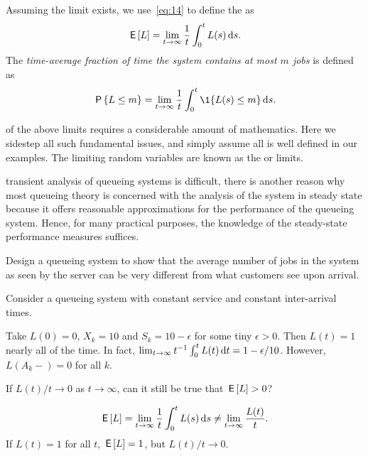 Assuming the limit exists, we use~\cref{eq:14} to define the  as
\begin{equation} \label{eq:46}
 \,\mathsf{E}\left[L\right] = \lim_{t\to\infty} \frac 1 t\int_0^t L(s) \,\textrm{d}s.
\end{equation}
 The \emph{time-average fraction of time the system contains at most $m$ jobs} is defined as
\begin{equation*}
 \P{\L\leq m} =\lim_{t\to\infty} \frac 1 t\int_0^t \1{\L(s)\leq m} \d s.
\end{equation*}

 of the above limits requires a considerable amount of mathematics.
Here we sidestep all such fundamental issues, and simply assume all is well defined in our examples.
The limiting random variables are known as the  or  limits.

 transient analysis of queueing systems is difficult, there is another reason why most queueing theory is concerned with the analysis of the system in steady state because it offers  reasonable approximations for the performance of the  queueing system. Hence, for many practical purposes, the knowledge of the steady-state performance measures suffices.

\begin{exercise}\label{ex:l-165}
Design a queueing system to show that the average number of jobs in the system as seen by the server can be very different from what customers see upon arrival.
\begin{hint}
Consider a queueing system with constant service and constant inter-arrival times.
\end{hint}
\begin{solution}
 Take $L(0) = 0$, $X_k = 10$ and $S_k = 10-\epsilon$ for some tiny
 $\epsilon>0$. Then $L(t) = 1$ nearly all of the time. In fact,
 $\lim_{t\to\infty}t^{-1}\int_0^t L(t) \,\textrm{d}t= 1-\epsilon/10$. However, $L(A_k-)=0$ for all $k$.
\end{solution}
\end{exercise}


\begin{exercise}\label{ex:90}
 If $L(t)/t \to 0$ as $t\to\infty$, can it still be true that $\,\mathsf{E}\left[L\right]>0$?
\begin{solution}
 \begin{equation*}
 \,\mathsf{E}\left[L\right] = \lim_{t\to\infty} \frac 1 t \int_0^t L(s) \,\textrm{d}s \neq \lim_{t\to\infty} \frac{L(t)}t.
 \end{equation*}
If $L(t)=1$ for all $t$, $\,\mathsf{E}\left[L\right] =1 $, but $L(t)/t \to 0$.
\end{solution}
\end{exercise}


